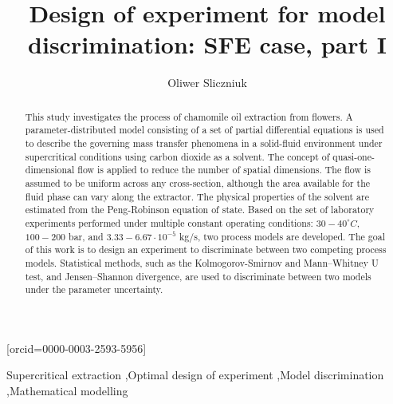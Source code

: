 \documentclass[a4paper,fleqn]{cas-dc}
\begin{document}
 

\title[mode=title]{Design of experiment for model discrimination: SFE case, part I}                      


\author[1]{Oliwer Sliczniuk}[orcid=0000-0003-2593-5956]
\cormark[1]



\address[1]{Aalto University, School of Chemical Engineering, Espoo, 02150, Finland}


\begin{abstract}
This study investigates the process of chamomile oil extraction from flowers. A parameter-distributed model consisting of a set of partial differential equations is used to describe the governing mass transfer phenomena in a solid-fluid environment under supercritical conditions using carbon dioxide as a solvent. The concept of quasi-one-dimensional flow is applied to reduce the number of spatial dimensions. The flow is assumed to be uniform across any cross-section, although the area available for the fluid phase can vary along the extractor. The physical properties of the solvent are estimated from the Peng-Robinson equation of state. Based on the set of laboratory experiments performed under multiple constant operating conditions: $30 - 40^\circ C$, $100 - 200$ bar, and $3.33-6.67 \cdot 10^{-5}$ kg/s, two process models are developed. The goal of this work is to design an experiment to discriminate between two competing process models. Statistical methods, such as the Kolmogorov-Smirnov and Mann–Whitney U test, and Jensen–Shannon divergence, are used to discriminate between two models under the parameter uncertainty.

\end{abstract}

\begin{keywords}
Supercritical extraction \sep Optimal design of experiment \sep Model discrimination \sep Mathematical modelling
\end{keywords}
\end{document}
